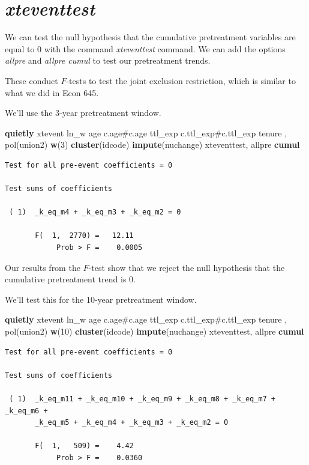 \documentclass[
]{book}
\newenvironment{Shaded}{\begin{snugshade}}{\end{snugshade}}
\newcommand{\FunctionTok}[1]{\textcolor[rgb]{0.13,0.29,0.53}{\textbf{#1}}}
\newcommand{\KeywordTok}[1]{\textcolor[rgb]{0.13,0.29,0.53}{\textbf{#1}}}
\newcommand{\NormalTok}[1]{#1}
\begin{document}
\section{\texorpdfstring{\emph{xteventtest}}{xteventtest}}\label{xteventtest}

We can test the null hypothesis that the cumulative pretreatment variables are equal to 0 with the command \emph{xteventtest} command. We can add the options \emph{allpre} and \emph{allpre cumul} to test our pretreatment trends.

These conduct \(F\)-tests to test the joint exclusion restriction, which is similar to what we did in Econ 645.

We'll use the 3-year pretreatment window.

\begin{Shaded}
\begin{Highlighting}[]
\KeywordTok{quietly}\NormalTok{ xtevent ln\_w age c.age\#c.age ttl\_exp c.ttl\_exp\#c.ttl\_exp tenure , pol(union2) }\FunctionTok{w}\NormalTok{(3) }\KeywordTok{cluster}\NormalTok{(idcode) }\KeywordTok{impute}\NormalTok{(nuchange)}
\NormalTok{xteventtest, allpre }\KeywordTok{cumul}
\end{Highlighting}
\end{Shaded}

\begin{verbatim}
Test for all pre-event coefficients = 0

Test sums of coefficients

 ( 1)  _k_eq_m4 + _k_eq_m3 + _k_eq_m2 = 0

       F(  1,  2770) =   12.11
            Prob > F =    0.0005
\end{verbatim}

Our results from the \(F\)-test show that we reject the null hypothesis that the cumulative pretreatment trend is 0.

We'll test this for the 10-year pretreatment window.

\begin{Shaded}
\begin{Highlighting}[]
\KeywordTok{quietly}\NormalTok{ xtevent ln\_w age c.age\#c.age ttl\_exp c.ttl\_exp\#c.ttl\_exp tenure , pol(union2) }\FunctionTok{w}\NormalTok{(10) }\KeywordTok{cluster}\NormalTok{(idcode) }\KeywordTok{impute}\NormalTok{(nuchange)}
\NormalTok{xteventtest, allpre }\KeywordTok{cumul}
\end{Highlighting}
\end{Shaded}

\begin{verbatim}
Test for all pre-event coefficients = 0

Test sums of coefficients

 ( 1)  _k_eq_m11 + _k_eq_m10 + _k_eq_m9 + _k_eq_m8 + _k_eq_m7 + _k_eq_m6 +
       _k_eq_m5 + _k_eq_m4 + _k_eq_m3 + _k_eq_m2 = 0

       F(  1,   509) =    4.42
            Prob > F =    0.0360
\end{verbatim}
\end{document}
